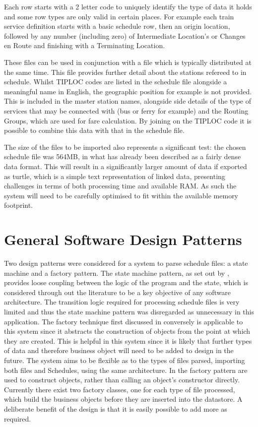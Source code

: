 Each row starts with a 2 letter code to uniquely identify the type of data it holds and some row types are only valid in certain places. For example each train service definition starts with a basic schedule row, then an origin location, followed by any number (including zero) of Intermediate Location's or Changes en Route and finishing with a Terminating Location. 

These files can be used in conjunction with a  file which is typically distributed at the same time. This file provides further detail about the stations refereed to in schedule. Whilst TIPLOC codes are listed in the schedule file alongside a meaningful name in English, the geographic position for example is not provided. This is included in the master station names, alongside side details of the type of services that may be connected with (bus or ferry for example) and the Routing Groups, which are used for fare calculation. By joining on the TIPLOC code it is possible to combine this data with that in the schedule file.

The size of the files to be imported also represents a significant test: the chosen schedule file was 564MB, in what has already been described as a fairly dense data format. This will result in a significantly larger amount of data if exported as turtle, which is a simple text representation of linked data, presenting challenges in terms of both processing time and available RAM. As such the system will need to be carefully optimised to fit within the available memory footprint.

\section{General Software Design Patterns}
Two design patterns were considered for a system to parse schedule files: a state machine and a factory pattern. The state machine pattern, as set out by \cite{Shalyto2006}, provides loose coupling between the logic of the program and the state, which is considered through out the literature to be a key objective of any software architecture. The transition logic required for processing schedule files is very limited and thus the state machine pattern was disregarded as unnecessary in this application. The factory technique first discussed in \cite{Gamma2002} conversely is applicable to this system since it abstracts the construction of objects from the point at which they are created. This is helpful in this system since it is likely that further types of data and therefore business object will need to be added to design in the future. The system aims to be flexible as to the types of files parsed, importing both  files and Schedules, using the same architecture. In the factory pattern  are used to construct objects, rather than calling an object's constructor directly. Currently there exist two factory classes, one for each type of file processed, which build the business objects before they are inserted into the datastore. A deliberate benefit of the design is that it is easily possible to add more as required.

